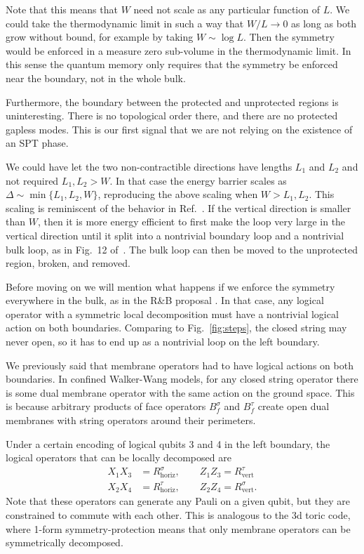 \documentclass[twocolumn, longbibliography]{revtex4-2}
\newcommand{\nn}{\nonumber\\}
\renewcommand{\vert}{\text{vert}}
\newcommand{\horiz}{\text{horiz}}
\begin{document}
Note that this means that $W$ need not scale as any particular function of $L$. We could take the thermodynamic limit in such a way that $W/L\to 0$ as long as both grow without bound, for example by taking $W\sim \log L$. Then the symmetry would be enforced in a measure zero sub-volume in the thermodynamic limit. In this sense the quantum memory only requires that the symmetry be enforced near the boundary, not in the whole bulk. 

Furthermore, the boundary between the protected and unprotected regions is uninteresting. There is no topological order there, and there are no protected gapless modes.
This is our first signal that we are not relying on the existence of an SPT phase.

We could have let the two non-contractible directions have lengths $L_1$ and $L_2$ and not required $L_1, L_2>W$. In that case the energy barrier scales as $\Delta\sim \min\{L_1,L_2,W\}$, reproducing the above scaling when $W>L_1,L_2$. 
This scaling is reminiscent of the behavior in Ref.~\cite{RobertsBartlett}. If the vertical direction is smaller than $W$, then it is more energy efficient to first make the loop very large in the vertical direction until it split into a nontrivial boundary loop and a nontrivial bulk loop, as in Fig.~12 of~\cite{RobertsBartlett}. The bulk loop can then be moved to the unprotected region, broken, and removed.

Before moving on we will mention what happens if we enforce the symmetry everywhere in the bulk, as in the R\&B proposal \cite{RobertsBartlett}. In that case, any logical operator with a symmetric local decomposition must have a nontrivial logical action on both boundaries. Comparing to Fig.~\ref{fig:steps}, the closed string may never open, so it has to end up as a nontrivial loop on the left boundary. 

We previously said that membrane operators had to have logical actions on both boundaries. In confined Walker-Wang models, for any closed string operator there is some dual membrane operator with the same action on the ground space. This is because arbitrary products of face operators $B_f^\sigma$ and $B_f^\tau$ create open dual membranes with string operators around their perimeters.

Under a certain encoding of logical qubits 3 and 4 in the left boundary, the logical operators that can be locally decomposed are 
\begin{align}
X_1X_3 &= R^\sigma_\horiz,\qquad Z_1Z_3 = R^\tau_\vert\nn
X_2X_4 &= R^\tau_\horiz, \qquad Z_2Z_4 = R^\sigma_\vert.
\label{eqn:fullenc}
\end{align}
Note that these operators can generate any Pauli on a given qubit, but they are constrained to commute with each other. This is analogous to the 3d toric code, where 1-form symmetry-protection means that only membrane operators can be symmetrically decomposed.
\end{document}
